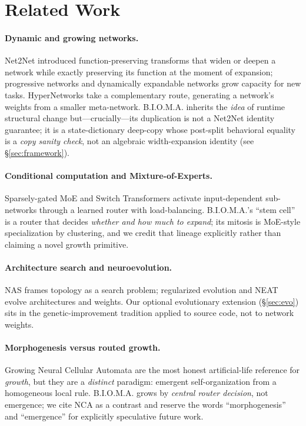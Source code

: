\documentclass[11pt]{article}
\newcommand{\bioma}{\textsc{B.I.O.M.A.}}
\begin{document}
\section{Related Work}
\paragraph{Dynamic and growing networks.}
Net2Net \cite{chen2016net2net} introduced function-preserving transforms that
widen or deepen a network while exactly preserving its function at the moment of
expansion; progressive networks \cite{rusu2016progressive} and dynamically
expandable networks \cite{yoon2018den} grow capacity for new tasks. HyperNetworks \cite{ha2017hypernetworks} take a
complementary route, generating a network's weights from a smaller meta-network.
\bioma{}
inherits the \emph{idea} of runtime structural change but---crucially---its
duplication is not a Net2Net identity guarantee; it is a state-dictionary
deep-copy whose post-split behavioral equality is a \emph{copy sanity check},
not an algebraic width-expansion identity (see \S\ref{sec:framework}).

\paragraph{Conditional computation and Mixture-of-Experts.}
Sparsely-gated MoE \cite{shazeer2017moe} and Switch Transformers
\cite{fedus2022switch} activate input-dependent sub-networks through a learned
router with load-balancing. \bioma{}'s ``stem cell'' is a router that decides
\emph{whether and how much to expand}; its mitosis is MoE-style specialization
by clustering, and we credit that lineage explicitly rather than claiming a
novel growth primitive.

\paragraph{Architecture search and neuroevolution.}
NAS \cite{zoph2017nas,elsken2019nas} frames topology as a search problem;
regularized evolution \cite{real2019amoeba} and NEAT
\cite{stanley2002neat,stanley2019neuroevolution} evolve architectures and
weights. Our optional evolutionary extension (\S\ref{sec:evo}) sits in the
genetic-improvement tradition \cite{koza1992gp,petke2018gi,legoues2012genprog}
applied to source code, not to network weights.

\paragraph{Morphogenesis versus routed growth.}
Growing Neural Cellular Automata \cite{mordvintsev2020growing} are the most
honest artificial-life reference for \emph{growth}, but they are a
\emph{distinct} paradigm: emergent self-organization from a homogeneous local
rule. \bioma{} grows by \emph{central router decision}, not emergence; we cite
NCA as a contrast and reserve the words ``morphogenesis'' and ``emergence'' for
explicitly speculative future work.
\end{document}
